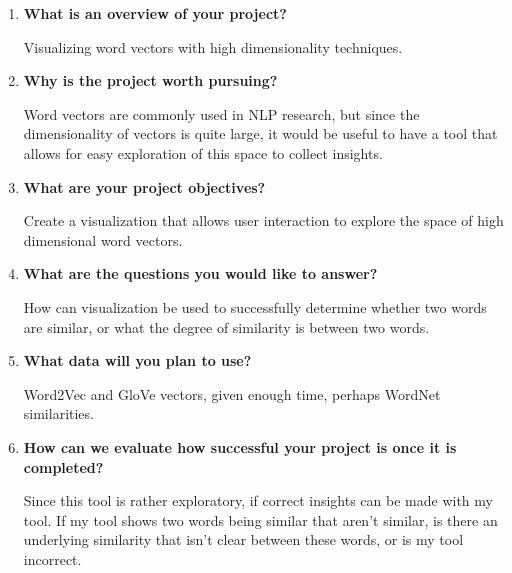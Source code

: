 \documentclass{article}
\begin{document}
\begin{enumerate}
\item \textbf{What is an overview of your project?}

Visualizing word vectors with high dimensionality techniques. 

\item \textbf{Why is the project worth pursuing?}

Word vectors are commonly used in NLP research, but since the dimensionality of vectors is quite large, it would be useful to have a tool that allows for easy exploration of this space to collect insights. 

\item \textbf{What are your project objectives?}

Create a visualization that allows user interaction to explore the space of high dimensional word vectors. 

\item \textbf{What are the questions you would like to answer?}

How can visualization be used to successfully determine whether two words are similar, or what the degree of similarity is between two words. 

\item \textbf{What data will you plan to use?}

Word2Vec and GloVe vectors, given enough time, perhaps WordNet similarities. 

\item \textbf{How can we evaluate how successful your project is once it is completed?}

Since this tool is rather exploratory, if correct insights can be made with my tool. If my tool shows two words being similar that aren't similar, is there an underlying similarity that isn't clear between these words, or is my tool incorrect. 
\end{enumerate}
\end{document}
